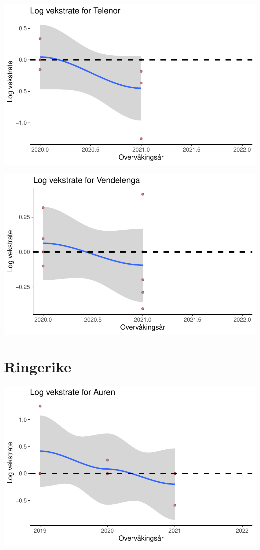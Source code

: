 \documentclass[
  letterpaper,
  DIV=11,
  numbers=noendperiod]{scrreport}
\begin{document}
\includegraphics{growthRate_files/figure-pdf/unnamed-chunk-4-11.pdf}

\includegraphics{growthRate_files/figure-pdf/unnamed-chunk-4-12.pdf}

\hypertarget{ringerike-1}{%
\section{Ringerike}\label{ringerike-1}}

\includegraphics{growthRate_files/figure-pdf/unnamed-chunk-5-1.pdf}
\end{document}
